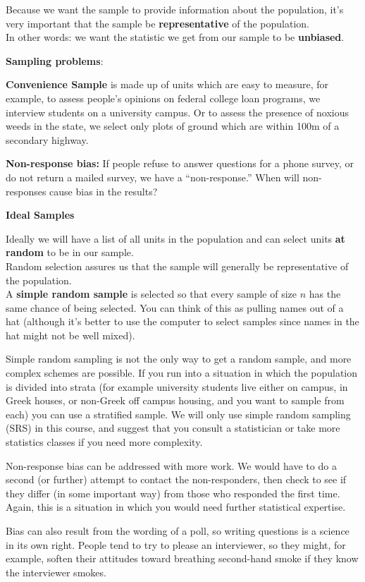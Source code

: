 Because we want the sample to provide information about the
population, it's very important that the sample be {\bf
  representative} of the population. \\
In other words: we want the statistic we get from our sample to be
{\bf unbiased}.\\

\begin{center}
  {\bf Sampling problems}:\vspace{-.5cm}
\end{center}
\begin{list}{}{}
\item [\bf Convenience Sample]  is made up of units which are easy to
  measure, for example, to assess people's opinions on federal college
  loan programs, we interview students on a university campus.  Or to
  assess the presence of noxious weeds in the state, we select only plots
  of ground which are within 100m of a secondary highway. 
\item [\bf Non-response bias:] If people refuse to answer questions
  for a phone survey, or do not return a mailed survey, we have a
  ``non-response.'' When will non-responses cause bias in the results?
\end{list}

\begin{center}
  {\bf Ideal Samples}
\end{center}
 Ideally we will have a list of all units in the population and can
 select units {\bf at random} to be in our sample.\\ 
Random selection assures us that the sample will generally be
representative of the population.\\
 A {\bf simple random sample} is selected so that every sample of size
 $n$ has the same chance of being selected.  You can think of this as
 pulling names out of a hat (although it's better to use the computer
 to select samples since names in the hat might not be well mixed). 

  Simple random sampling is not the only way to get a random
  sample, and more complex schemes are possible.  If you run into a
  situation in which the population is divided into strata (for
  example university students live either on campus, in Greek houses,
  or non-Greek off campus housing, and you want to sample from each)
  you can use a stratified sample.  We will only use simple random
  sampling (SRS) in this course, and suggest that you consult a
  statistician or take more statistics classes if you need more
  complexity. 

 Non-response bias can be addressed with more work.  We would have to
 do a second (or further) attempt to contact the non-responders, then 
 check to see if they differ (in some important way) from those who
 responded the first time.  Again, this is a situation in which you
 would need further statistical expertise.

 Bias can also result from the wording of a poll, so writing questions
 is a science in its own right.  People tend to try
 to please an interviewer, so they might, for example, soften their
 attitudes toward breathing second-hand smoke if they know the interviewer
 smokes. 


